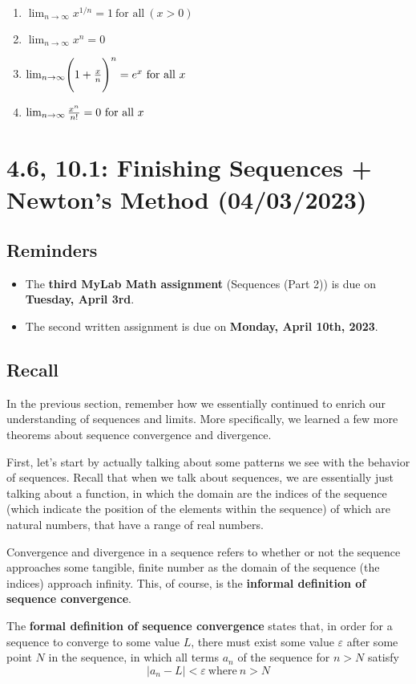 \documentclass{report}
\begin{document}
\begin{sloppypar}
\begin{center}
{{\begin{enumerate}
        \item $ \lim_{n \rightarrow \infty} x^{1/n} = 1 ~ \textrm{for all} ~ (x > 0)$
        \item $\lim_{n \rightarrow \infty} x^{n} = 0 $
        \item $ \lim_{n \rightarrow \infty} \Biggr( 1 + \frac{x}{n}\Biggr)^{n} = e^{x} ~\textrm{for all $ x $}$
        \item $ \lim_{n \rightarrow \infty} \frac{x^{n}}{n!} = 0 ~ \textrm{for all $ x $}$

      \end{enumerate}
    }
  }
\end{center}




\chapter{4.6, 10.1: Finishing Sequences +  Newton's Method (04/03/2023)}
\section{Reminders}
\begin{itemize}
  \item The \textbf{third MyLab Math assignment} (Sequences
        (Part 2)) is due on \textbf{Tuesday, April 3rd}.
  \item The second written assignment is due on \textbf{
        Monday, April 10th, 2023}.
\end{itemize}
\section{Recall}
In the previous section, remember how we essentially continued to enrich our understanding of sequences and limits.
More specifically, we learned a few more theorems about sequence convergence and divergence.
\par First, let's start by actually talking about some patterns we see with the behavior of sequences. Recall
that when we talk about sequences, we are essentially just talking about a function, in which the domain are the indices of the
sequence (which indicate the position of the elements within the sequence) of which are natural numbers, that have a range of real numbers.
\par Convergence and divergence in a sequence refers to whether or not the sequence approaches some tangible, finite number
as the domain of the sequence (the indices) approach infinity. This, of course, is the \textbf{informal definition of
  sequence convergence}.
\par The \textbf{formal definition of sequence convergence} states that, in order for a sequence to converge to some value $ L $, there must exist some value $ \varepsilon $ after some point $ N $ in the sequence, in which all terms $ a_{n} $ of the sequence for $ n > N $ satisfy
\[ | a_{n} - L | < \varepsilon ~\textrm{where} ~ n > N \]


\end{sloppypar}
\end{document}
